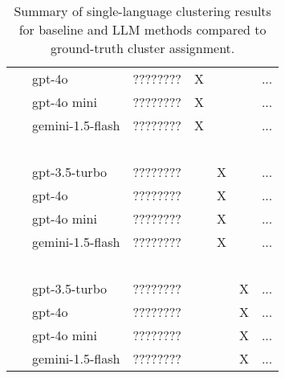 \begin{table*}[ht!]
\begin{tabular}{l|l|cccc|r}
        ~                     & gpt-4o            & ????????               & X              & ~                  & ~                    & ... \\
        ~                     & gpt-4o mini       & ????????               & X              & ~                  & ~                    & ... \\
        ~                     & gemini-1.5-flash  & ????????               & X              & ~                  & ~                    & ... \\
        ~                     & ~                 & ~                      & ~              & ~                  & ~                    & ~   \\
        ~                     & gpt-3.5-turbo     & ????????               & ~              & X                  & ~                    & ... \\
        ~                     & gpt-4o            & ????????               & ~              & X                  & ~                    & ... \\
        ~                     & gpt-4o mini       & ????????               & ~              & X                  & ~                    & ... \\
        ~                     & gemini-1.5-flash  & ????????               & ~              & X                  & ~                    & ... \\
        ~                     & ~                 & ~                      & ~              & ~                  & ~                    & ~   \\
        ~                     & gpt-3.5-turbo     & ????????               & ~              & ~                  & X                    & ... \\
        ~                     & gpt-4o            & ????????               & ~              & ~                  & X                    & ... \\
        ~                     & gpt-4o mini       & ????????               & ~              & ~                  & X                    & ... \\
        ~                     & gemini-1.5-flash  & ????????               & ~              & ~                  & X                    & ... \\

    \end{tabular}
    \caption{Summary of single-language clustering results for baseline and LLM methods compared to ground-truth cluster assignment.}
    \label{tab:single-lang-results}
\end{table*}





